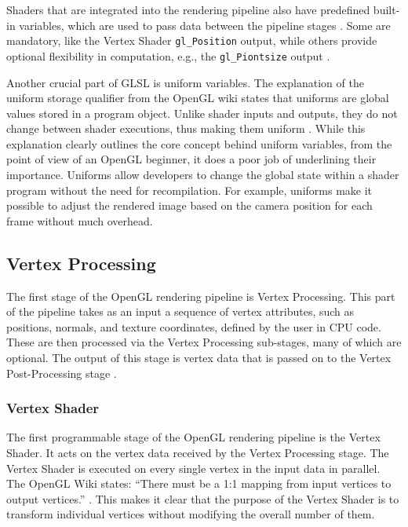 \documentclass[
  digital,     %
  oneside,     %
  nosansbold,  %
  nocolorbold, %
  lof,         %
  lot,         %
]{fithesis4}
\begin{document}
Shaders that are integrated into the rendering pipeline also have predefined built-in variables, which
are used to pass data between the pipeline stages \cite{learnopengl-triangle}. Some are mandatory, like the Vertex Shader
\verb|gl_Position| output, while others provide optional flexibility in computation, e.g., the
\verb|gl_Piontsize| output \cite{openglwiki-vertex-shader}.

Another crucial part of GLSL is uniform variables. The explanation of the uniform storage qualifier
from the OpenGL wiki states that uniforms are global values stored in a program object. Unlike
shader inputs and outputs, they do not change between shader executions, thus making them
uniform \cite{openglwiki-uniform}. While this explanation clearly outlines the core concept behind uniform variables, from
the point of view of an OpenGL beginner, it does a poor job of underlining their importance.
Uniforms allow developers to change the global state within a shader program without the need for
recompilation. For example, uniforms make it possible to adjust the rendered image based on the
camera position for each frame without much overhead.

\subsection{Vertex Processing}
The first stage of the OpenGL rendering pipeline is Vertex Processing. This part of the pipeline takes
as an input a sequence of vertex attributes, such as positions, normals, and texture coordinates,
defined by the user in CPU code. These are then processed via the Vertex Processing sub-stages,
many of which are optional. The output of this stage is vertex data that is passed
on to the Vertex Post-Processing stage \cite{openglwiki-vertex-processing}.

\subsubsection{Vertex Shader}
The first programmable stage of the OpenGL rendering pipeline is the Vertex Shader. It acts on
the vertex data received by the Vertex Processing stage. The Vertex Shader is executed on every
single vertex in the input data in parallel. The OpenGL Wiki states: \enquote{There must be a 1:1 mapping from
input vertices to output vertices.} \cite{openglwiki-vertex-shader}.
This makes it clear that the purpose of the Vertex Shader is to
transform individual vertices without modifying the overall number of them.
\end{document}
